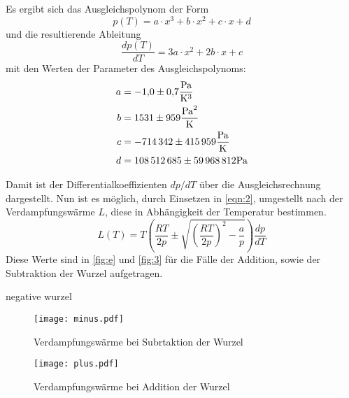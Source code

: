 \noindent Es ergibt sich das Ausgleichspolynom der Form 
\begin{equation*}
  p(T) = a \cdot x^3 + b \cdot x^2 + c \cdot x + d 
\end{equation*}
\noindent und die resultierende Ableitung
\begin{equation*}
  \frac{dp(T)}{dT} = 3a \cdot x^2 + 2b \cdot x + c 
\end{equation*}
mit den Werten der Parameter des Ausgleichspolynoms:
\begin{align*}
  a &= \num{-1.0 +- 0.7}\unit{\pascal\per\cubic\kelvin}\\
  b &= \num{1531 +- 959}\unit{\pascal\per\squared\kelvin}\\
  c &= \num{-714342 +- 415959}\unit{\pascal\per\kelvin}\\
  d &= \num{108512685 +- 59968812}\unit{\pascal}\\
\end{align*}

\noindent Damit ist der Differentialkoeffizienten $dp/dT$ über die
Ausgleichsrechnung dargestellt. Nun ist es möglich, durch Einsetzen in
\autoref{eqn:2}, umgestellt nach der Verdampfungswärme $L$,
diese in Abhängigkeit der Temperatur bestimmen.
\begin{equation}
L(T) = T \left(\frac{RT}{2p}\pm\sqrt{\left(\frac{RT}{2p}\right)^2-\frac{a}{p}}\right) \frac{dp}{dT}
\end{equation}
\noindent Diese Werte sind in \autoref{fig:e} und \autoref{fig:3} 
für die Fälle der Addition, sowie der Subtraktion der 
Wurzel aufgetragen.







negative wurzel
\begin{figure}[H]
  \centering
  \texttt{[image: minus.pdf]}
  \caption{Verdampfungswärme bei Subrtaktion der Wurzel}
  \label{fig:e}
\end{figure}

\begin{figure}[H]
  \centering
  \texttt{[image: plus.pdf]}
  \caption{Verdampfungswärme bei Addition der Wurzel}
  \label{fig:3}
\end{figure}


